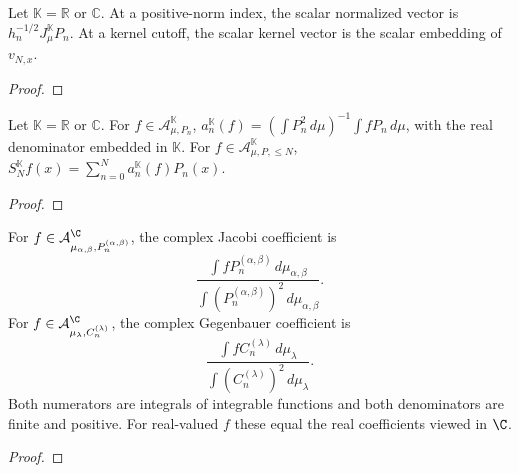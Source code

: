 \begin{supporting}

\begin{theorem}
\label{thm:scalar-normalization-characterisation}
\leanok
Let $\mathbb K=\mathbb R$ or $\mathbb C$.
At a positive-norm index, the scalar normalized vector is
$h_n^{-1/2}J_\mu^{\mathbb K}P_n$. At a kernel cutoff, the scalar kernel
vector is the scalar embedding of $v_{N,x}$.
\end{theorem}
\begin{proof}
\leanok
\end{proof}

\begin{theorem}
\label{thm:scalar-coefficient-characterisation}
\leanok
Let $\mathbb K=\mathbb R$ or $\mathbb C$.
For $f\in\mathcal A_{\mu,P_n}^{\mathbb K}$,
$a_n^{\mathbb K}(f)=(\int P_n^2\,d\mu)^{-1}\int fP_n\,d\mu$,
with the real denominator embedded in $\mathbb K$.
For $f\in\mathcal A_{\mu,P,\le N}^{\mathbb K}$,
$S_N^{\mathbb K}f(x)=\sum_{n=0}^N a_n^{\mathbb K}(f)P_n(x)$.
\end{theorem}
\begin{proof}
\leanok
\end{proof}

\begin{theorem}
\label{thm:complex-family-coefficient-characterisation}
\leanok
For $f\in\mathcal A_{\mu_{\alpha,\beta},P_n^{(\alpha,\beta)}}^{\C}$, the
complex Jacobi coefficient is
\[
 \frac{\int fP_n^{(\alpha,\beta)}\,d\mu_{\alpha,\beta}}
 {\int (P_n^{(\alpha,\beta)})^2\,d\mu_{\alpha,\beta}}.
\]
For $f\in\mathcal A_{\mu_\lambda,C_n^{(\lambda)}}^{\C}$, the complex
Gegenbauer coefficient is
\[
 \frac{\int fC_n^{(\lambda)}\,d\mu_\lambda}
 {\int (C_n^{(\lambda)})^2\,d\mu_\lambda}.
\]
Both numerators are integrals of integrable functions and both denominators
are finite and positive. For real-valued $f$ these equal the real coefficients
viewed in $\C$.
\end{theorem}
\begin{proof}
\leanok
\end{proof}


\end{supporting}
